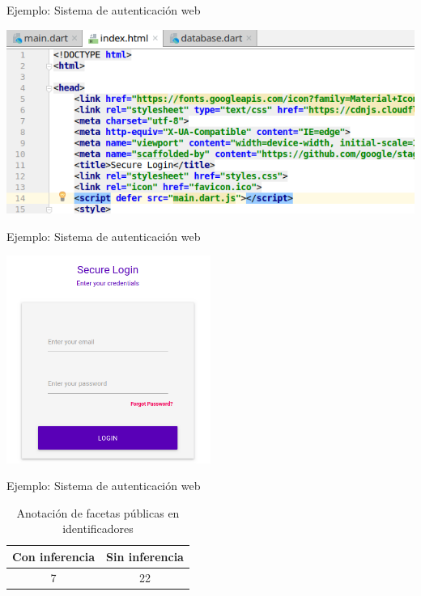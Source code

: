 \documentclass[aspectratio=169,10pt]{beamer}
\begin{document}
\begin{frame}[fragile]{Ejemplo: Sistema de autenticación web}
	\begin{center}
		\includegraphics[width=1.0\textwidth]{images/html0.png}
	\end{center}
\end{frame}

\begin{frame}[fragile]{Ejemplo: Sistema de autenticación web}
	\begin{center}
		\includegraphics[width=0.5\textwidth]{images/screen4.png}
	\end{center}
\end{frame}

\begin{frame}[fragile]{Ejemplo: Sistema de autenticación web}
	\begin{table}
		\caption{Anotación de facetas públicas en identificadores}
		\begin{tabular}{c|c}
      Con inferencia & Sin inferencia\\
      \hline
      7 & 22\\
		\end{tabular}
	\end{table}
\end{frame}
\end{document}
